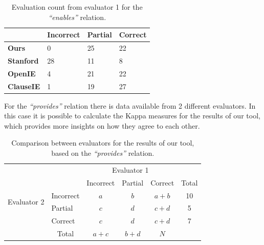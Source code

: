 \documentclass[11pt,a4paper,openright]{memoir}
\begin{document}
\begin{table}[!htbp]
  \centering
    \begin{tabular}{|m{2cm}|m{2cm}|m{2cm}|m{2cm}|}
\hline

 & \textbf{Incorrect} & \textbf{Partial} & \textbf{Correct} \\
\hline

\textbf{Ours}  & 0 & 25 & 22 \\
\hline

\textbf{Stanford}  & 28 & 11 & 8 \\
\hline

\textbf{OpenIE}  & 4 & 21 & 22 \\
\hline

\textbf{ClauseIE}  & 1 & 19 & 27 \\
\hline
    \end{tabular}
  \caption[Evaluation count from evaluator 1 for the \emph{\enquote{enables}} relation.]{Evaluation count from evaluator 1 for the \emph{\enquote{enables}} relation.}
  \label{tab:evaluation_count_enables}
\end{table}

For the \emph{\enquote{provides}} relation there is data available from 2 different evaluators. In this case it is possible to calculate the Kappa measures for the results of our tool, which provides more insights on how they agree to each other.

\begin{table}[!htbp]
  \centering
\begin{tabular}{l|l|c|c|c|c}
\multicolumn{2}{c}{}&\multicolumn{3}{c}{Evaluator 1}&\\
\cline{3-5}
\multicolumn{2}{c|}{}&Incorrect&Partial&Correct&\multicolumn{1}{c}{Total}\\
\cline{2-5}
\multirow{2}{*}{Evaluator 2}& Incorrect & $a$ & $b$ & $a+b$ & 10 \\
\cline{2-5}
& Partial & $c$ & $d$ & $c+d$ & 5 \\
\cline{2-5}
& Correct & $c$ & $d$ & $c+d$ & 7 \\
\cline{2-5}
\multicolumn{1}{c}{} & \multicolumn{1}{c}{Total} & \multicolumn{1}{c}{$a+c$} & \multicolumn{1}{c}{$b+d$} & \multicolumn{1}{c}{$N$} & \\
\end{tabular}


  \caption[Comparison between evaluators for the results of our tool.]{Comparison between evaluators for the results of our tool, based on the \emph{\enquote{provides}} relation.}
  \label{tab:comparison_results_evaluators}
\end{table}
\end{document}

